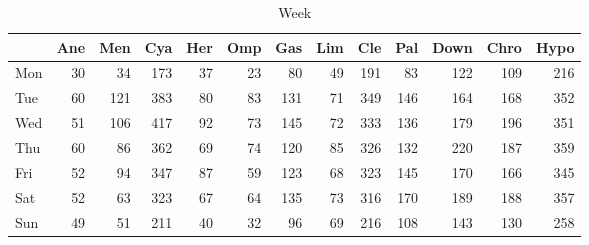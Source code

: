 \documentclass[article,nojss]{jss}\usepackage[]{graphicx}\usepackage[]{color}
\newenvironment{knitrout}{}{} %
\begin{document}
\begin{appendix}
\begin{knitrout}
\begin{table}[H]
\caption{\label{tab:weekdata}Week\label{tab:week}}
\centering
\begin{tabular}[t]{l|r|r|r|r|r|r|r|r|r|r|r|r}
\hline
  & Ane & Men & Cya & Her & Omp & Gas & Lim & Cle & Pal & Down & Chro & Hypo\\
\hline
Mon & 30 & 34 & 173 & 37 & 23 & 80 & 49 & 191 & 83 & 122 & 109 & 216\\
\hline
Tue & 60 & 121 & 383 & 80 & 83 & 131 & 71 & 349 & 146 & 164 & 168 & 352\\
\hline
Wed & 51 & 106 & 417 & 92 & 73 & 145 & 72 & 333 & 136 & 179 & 196 & 351\\
\hline
Thu & 60 & 86 & 362 & 69 & 74 & 120 & 85 & 326 & 132 & 220 & 187 & 359\\
\hline
Fri & 52 & 94 & 347 & 87 & 59 & 123 & 68 & 323 & 145 & 170 & 166 & 345\\
\hline
Sat & 52 & 63 & 323 & 67 & 64 & 135 & 73 & 316 & 170 & 189 & 188 & 357\\
\hline
Sun & 49 & 51 & 211 & 40 & 32 & 96 & 69 & 216 & 108 & 143 & 130 & 258\\
\hline
\end{tabular}
\end{table}

\end{knitrout}
\end{appendix}
\end{document}
